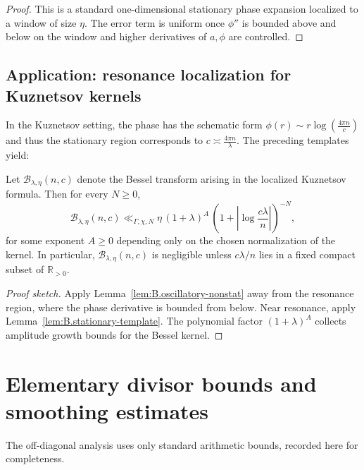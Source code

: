 \begin{proof}
This is a standard one-dimensional stationary phase expansion localized to a window of size $\eta$.  The error term is
uniform once $\phi''$ is bounded above and below on the window and higher derivatives of $a,\phi$ are controlled.
\end{proof}

\subsection{Application: resonance localization for Kuznetsov kernels}
\label{subsec:B.kuznetsov-resonance}

In the Kuznetsov setting, the phase has the schematic form $\phi(r)\sim r\log(\tfrac{4\pi n}{c})$ and thus the
stationary region corresponds to $c\asymp \tfrac{4\pi n}{\lambda}$.  The preceding templates yield:

\begin{proposition}
\label{prop:B.resonance-bound}
Let $\mathcal{B}_{\lambda,\eta}(n,c)$ denote the Bessel transform arising in the localized Kuznetsov formula.
Then for every $N\ge 0$,
\begin{equation}
\label{eq:B.resonance-bound}
\mathcal{B}_{\lambda,\eta}(n,c)
\ll_{\Gamma,\chi,N}
\eta\,(1+\lambda)^{A}\,
\left(1+\left|\log\frac{c\lambda}{n}\right|\right)^{-N},
\end{equation}
for some exponent $A\ge 0$ depending only on the chosen normalization of the kernel.
In particular, $\mathcal{B}_{\lambda,\eta}(n,c)$ is negligible unless $c\lambda/n$ lies in a fixed compact subset of
$\mathbb{R}_{>0}$.
\end{proposition}

\begin{proof}[Proof sketch]
Apply Lemma~\ref{lem:B.oscillatory-nonstat} away from the resonance region, where the phase derivative is bounded from
below.  Near resonance, apply Lemma~\ref{lem:B.stationary-template}.  The polynomial factor $(1+\lambda)^A$ collects
amplitude growth bounds for the Bessel kernel.
\end{proof}

\section{Elementary divisor bounds and smoothing estimates}
\label{sec:B.arithmetic}

The off-diagonal analysis uses only standard arithmetic bounds, recorded here for completeness.


